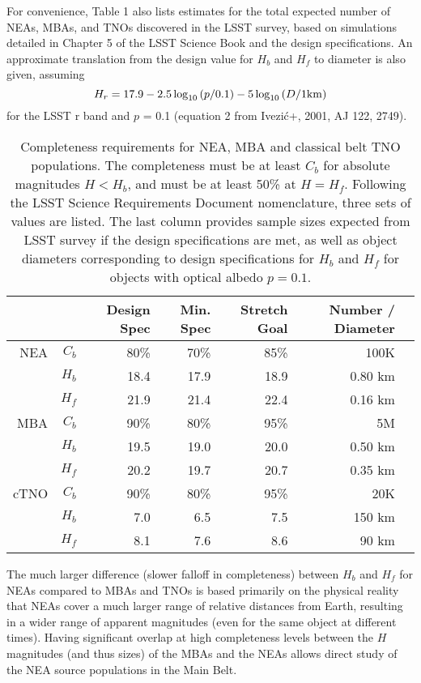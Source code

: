 \documentclass[manuscript]{aastex}
\begin{document}
For convenience, Table 1 also lists estimates for the total expected number of NEAs, MBAs, and TNOs discovered 
in the LSST survey, based on simulations detailed in Chapter 5 of the LSST Science Book and the design specifications.
An approximate translation from the design value for $H_b$ and $H_f$ to diameter is also given, assuming 
\begin{equation}
H_r = 17.9 - 2.5\log_{10}\left(p/0.1\right) - 5\log_{10}\left(D/1\rm{km}\right)
\end{equation}
for the LSST r band and $p$ = 0.1 (equation 2 from  Ivezi\'{c}+, 2001, AJ 122, 2749). 

\begin{table}[h]
\begin{tabular}{|r|r|r|r|r|r|r|}
\hline 
       & & Design Spec & Min. Spec  & Stretch Goal  & Number / Diameter\\
\hline  
NEA & $C_b$ & 80\% & 70\% & 85\% & 100K \\
       &  $H_b$ & 18.4 & 17.9 & 18.9 & 0.80 km  \\
       &  $H_f$  & 21.9 & 21.4 & 22.4 & 0.16 km\\
\hline
MBA & $C_b$ & 90\% & 80\% & 95\% & 5M \\
        & $H_b$ & 19.5 & 19.0 & 20.0 & 0.50 km\\
         & $H_f$ & 20.2 & 19.7 & 20.7 & 0.35 km \\ 
\hline
cTNO & $C_b$ & 90\% & 80\% & 95\% & 20K\\
             & $H_b$ & 7.0 & 6.5 & 7.5 & 150 km\\
             & $H_f$ & 8.1 & 7.6 & 8.6 & 90 km \\
\hline                         
\end{tabular}                  
\caption{Completeness requirements for NEA, MBA and classical belt TNO populations. The completeness
must be at least $C_b$ for absolute magnitudes $H < H_b$, and must be at least 50\% at $H=H_f$. Following
the LSST Science Requirements Document nomenclature, three sets of values are listed. The last column provides 
sample sizes expected from LSST survey if the design specifications are met, as well as object diameters 
corresponding to design specifications for $H_b$ and $H_f$ for objects with optical albedo $p=0.1$.
}
\label{SSOcompleteness}
\end{table}

The much larger difference (slower falloff in completeness) between $H_b$ and $H_f$ for NEAs compared to MBAs and TNOs is based primarily on the physical reality that NEAs cover a much larger range of relative distances from Earth, resulting in a wider range of apparent magnitudes (even for the same object at different times). Having significant overlap at high completeness levels between the $H$ magnitudes (and thus sizes) of the MBAs and the NEAs allows direct study of the NEA source populations in the Main Belt. 
\end{document}
